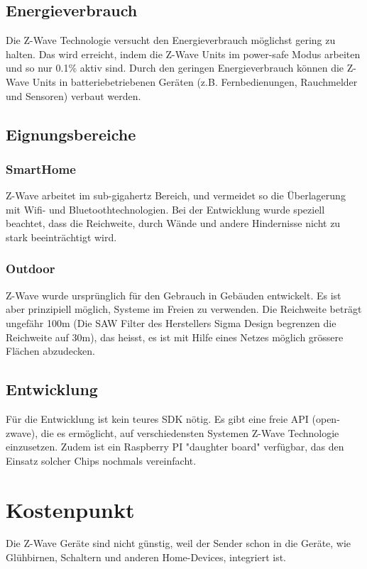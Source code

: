 \documentclass[a4paper,11pt]{article}
\begin{document}
\subsection*{Energieverbrauch}
Die Z-Wave Technologie versucht den Energieverbrauch möglichst gering zu halten. Das wird erreicht, indem die Z-Wave Units im power-safe Modus arbeiten und so nur 0.1\% aktiv sind. Durch den geringen Energieverbrauch können die Z-Wave Units in batteriebetriebenen Geräten (z.B. Fernbedienungen, Rauchmelder und Sensoren) verbaut werden.

\subsection*{Eignungsbereiche}
\subsubsection*{SmartHome}
Z-Wave arbeitet im sub-gigahertz Bereich, und vermeidet so die Überlagerung mit Wifi- und Bluetoothtechnologien. Bei der Entwicklung wurde speziell beachtet, dass die Reichweite, durch Wände und andere Hindernisse nicht zu stark beeinträchtigt wird.

\subsubsection*{Outdoor}
Z-Wave wurde ursprünglich für den Gebrauch in Gebäuden entwickelt. Es ist aber prinzipiell möglich, Systeme im Freien zu verwenden. Die Reichweite beträgt ungefähr 100m (Die SAW Filter des Herstellers Sigma Design begrenzen die Reichweite auf 30m), das heisst, es ist mit Hilfe eines Netzes möglich grössere Flächen abzudecken.

\subsection*{Entwicklung}
Für die Entwicklung ist kein teures SDK nötig. Es gibt eine freie API (open-zwave), die es ermöglicht, auf verschiedensten Systemen Z-Wave Technologie einzusetzen. Zudem ist ein Raspberry PI "daughter board" verfügbar, das den Einsatz solcher Chips nochmals vereinfacht.

\newpage

\section*{Kostenpunkt}
Die Z-Wave Geräte sind nicht günstig, weil der Sender schon in die Geräte, wie Glühbirnen, Schaltern und anderen Home-Devices, integriert ist.\\
\end{document}
